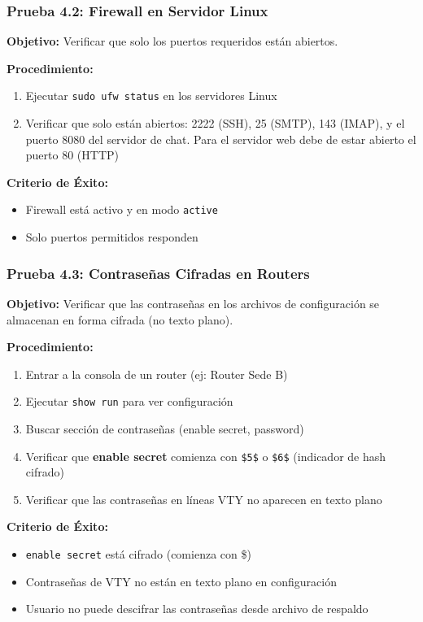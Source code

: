 \subsubsection{Prueba 4.2: Firewall en Servidor Linux}

\textbf{Objetivo:} Verificar que solo los puertos requeridos están abiertos.

\textbf{Procedimiento:}
\begin{enumerate}
\item Ejecutar \texttt{sudo ufw status} en los servidores Linux
\item Verificar que solo están abiertos: 2222 (SSH), 25 (SMTP),
  143 (IMAP), y el puerto 8080 del servidor de chat. 
  Para el servidor web debe de estar abierto el puerto 80 (HTTP)
\end{enumerate}

\textbf{Criterio de Éxito:}
\begin{itemize}
\item Firewall está activo y en modo \texttt{active}
\item Solo puertos permitidos responden
\end{itemize}


\subsubsection{Prueba 4.3: Contraseñas Cifradas en Routers}

\textbf{Objetivo:} Verificar que las contraseñas en los archivos de configuración
se almacenan en forma cifrada (no texto plano).

\textbf{Procedimiento:}
\begin{enumerate}
\item Entrar a la consola de un router (ej: Router Sede B)
\item Ejecutar \texttt{show run} para ver configuración
\item Buscar sección de contraseñas (enable secret, password)
\item Verificar que \textbf{enable secret} comienza con \texttt{\$5\$} o \texttt{\$6\$}
  (indicador de hash cifrado)
\item Verificar que las contraseñas en líneas VTY no aparecen en texto plano
\end{enumerate}

\textbf{Criterio de Éxito:}
\begin{itemize}
\item \texttt{enable secret} está cifrado (comienza con \$)
\item Contraseñas de VTY no están en texto plano en configuración
\item Usuario no puede descifrar las contraseñas desde archivo de respaldo
\end{itemize}


